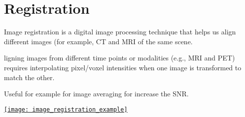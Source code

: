 \chapter{Registration}

Image registration is a digital image processing technique that helps us align different images (for example, \gls{CT} and \gls{MRI} of the same scene.

ligning images from different time points or modalities (e.g., MRI and PET) requires interpolating pixel/voxel intensities when one image is transformed to match the other.

Useful for example for image averaging for increase the SNR.


\begin{center}
  \href{https://3dqlab.stanford.edu/image-registration/}{\texttt{[image: image\_registration\_example]}}
\end{center}


